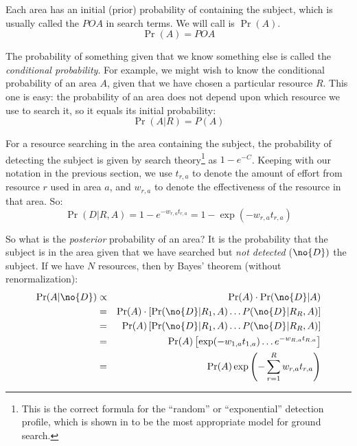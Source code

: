 Each area has an initial (prior) probability of containing the
subject, which is usually called the $POA$ in search terms. We will
call is $\Pr(A)$.
\begin{equation}
  \label{eq:p(a)}
  \Pr(A) = POA
\end{equation}

The probability of something given that we know something else is
called the \emph{conditional probability}. For example, we might wish
to know the conditional probability of an area $A$, given that we have
chosen a particular resource $R$. This one is easy: the probability of
an area does not depend upon which resource we use
to search it, so it equals its initial probability:
\begin{equation}
  \label{eq:p(a|r)}
  \Pr(A|R) = P(A)
\end{equation}

For a resource searching in the area containing the subject, the
probability of detecting the subject is given by search
theory\footnote{This is the correct formula for the ``random'' or
  ``exponential'' detection profile, which is shown in \cite{} to be
  the most appropriate model for ground search.}
as $1 - e^{-C}$. Keeping with our notation in the previous section, we
use $t_{r,a}$ to denote the amount of effort from resource $r$ used in
area $a$, and $w_{r,a}$ to denote the effectiveness of the resource in
that area. So:
\begin{equation}
  \label{eq:4}
  \Pr(D|R,A) = 1 - e^{-w_{r,a} t_{r,a}} = 1 - \exp(-w_{r,a} t_{r,a})
\end{equation}

So what is the \emph{posterior} probability of an area? It is the
probability that the subject is in the area given that we have
searched but \emph{not detected} ($\no{D})$ the subject. If we have
$N$ resources, then by Bayes'
theorem (without renormalization):
\begin{eqnarray}
  \label{eq:a|-d}
  \Pr(A|\no{D}) &\propto& \Pr(A) \cdot \Pr(\no{D}|A)\\
  \nonumber     &=& \Pr(A) \cdot \left[\Pr(\no{D}|R_1,A) \ldots 
                   P(\no{D}|R_R,A)\right] \\
  \nonumber     &=& \Pr(A) \left[\Pr(\no{D}|R_1,A) \ldots
                   P(\no{D}|R_R,A)\right] \\
  \nonumber     &=& \Pr(A) \left[\exp(-w_{1,a} t_{1,a}) \ldots
                   e^{-w_{R,a} t_{R,a}} \right]\\
  \nonumber     &=& \Pr(A) \exp\left(-\sum_{r=1}^R w_{r,a} t_{r,a}\right)
\end{eqnarray} 

